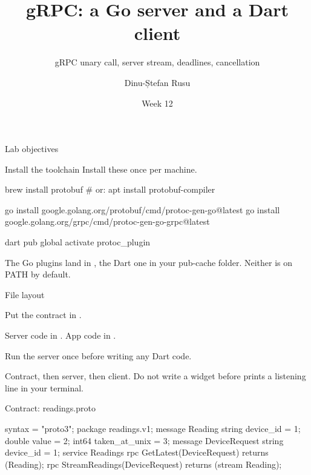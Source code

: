 \documentclass[10pt,aspectratio=169,t]{beamer}
\title{gRPC: a Go server and a Dart client}
\subtitle{gRPC unary call, server stream, deadlines, cancellation}
\author{Dinu-Ștefan Rusu}
\date{Week 12}
\begin{document}
\titleframe

\begin{frame}[eyebrow=Today]{Lab objectives}
  \vskip 2mm
  \begin{grid}[2]
  \end{grid}
  \vskip 6mm
\end{frame}

\begin{frame}[fragile,eyebrow=Setup]{Install the toolchain}
  \vskip 1mm
  Install these once per machine.
\begin{shell}
brew install protobuf   # or: apt install protobuf-compiler

go install google.golang.org/protobuf/cmd/protoc-gen-go@latest
go install google.golang.org/grpc/cmd/protoc-gen-go-grpc@latest

dart pub global activate protoc_plugin
\end{shell}
  \begin{hint}
    The Go plugins land in , the Dart one in your pub-cache  folder. Neither is on PATH by default.
  \end{hint}
\end{frame}

\begin{frame}[fragile,eyebrow=Setup]{File layout}
  \begin{steps}
    \item Put the contract in .
    \item Server code in . App code in .
    \item Run the server once before writing any Dart code.
  \end{steps}
  \begin{hint}
    Contract, then server, then client. Do not write a widget before  prints a listening line in your terminal.
  \end{hint}
\end{frame}

\begin{frame}[fragile,eyebrow=Setup]{Contract: readings.proto}
\begin{codeblock}
syntax = "proto3";
package readings.v1;
message Reading {
  string device_id    = 1;
  double value         = 2;
  int64  taken_at_unix = 3;
}
message DeviceRequest { string device_id = 1; }
service Readings {
  rpc GetLatest(DeviceRequest) returns (Reading);
  rpc StreamReadings(DeviceRequest) returns (stream Reading);
}
\end{codeblock}
  \vskip 1mm
\end{frame}
\end{document}

